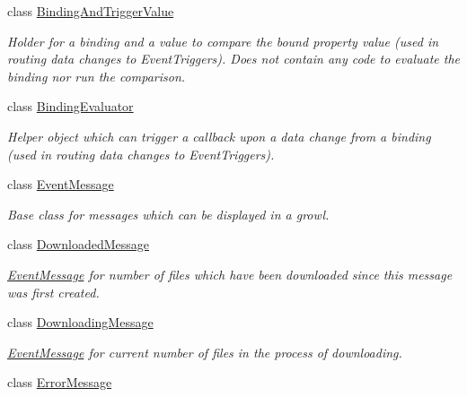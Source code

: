 \begin{DoxyCompactItemize}
\item 
class \hyperlink{class_cloud_api_public_1_1_event_message_receiver_1_1_binding_and_trigger_value}{Binding\-And\-Trigger\-Value}
\begin{DoxyCompactList}\small\item\em Holder for a binding and a value to compare the bound property value (used in routing data changes to Event\-Triggers). Does not contain any code to evaluate the binding nor run the comparison. \end{DoxyCompactList}\item 
class \hyperlink{class_cloud_api_public_1_1_event_message_receiver_1_1_binding_evaluator}{Binding\-Evaluator}
\begin{DoxyCompactList}\small\item\em Helper object which can trigger a callback upon a data change from a binding (used in routing data changes to Event\-Triggers). \end{DoxyCompactList}\item 
class \hyperlink{class_cloud_api_public_1_1_event_message_receiver_1_1_event_message}{Event\-Message}
\begin{DoxyCompactList}\small\item\em Base class for messages which can be displayed in a growl. \end{DoxyCompactList}\item 
class \hyperlink{class_cloud_api_public_1_1_event_message_receiver_1_1_downloaded_message}{Downloaded\-Message}
\begin{DoxyCompactList}\small\item\em \hyperlink{class_cloud_api_public_1_1_event_message_receiver_1_1_event_message}{Event\-Message} for number of files which have been downloaded since this message was first created. \end{DoxyCompactList}\item 
class \hyperlink{class_cloud_api_public_1_1_event_message_receiver_1_1_downloading_message}{Downloading\-Message}
\begin{DoxyCompactList}\small\item\em \hyperlink{class_cloud_api_public_1_1_event_message_receiver_1_1_event_message}{Event\-Message} for current number of files in the process of downloading. \end{DoxyCompactList}\item 
class \hyperlink{class_cloud_api_public_1_1_event_message_receiver_1_1_error_message}{Error\-Message}

\end{DoxyCompactItemize}

